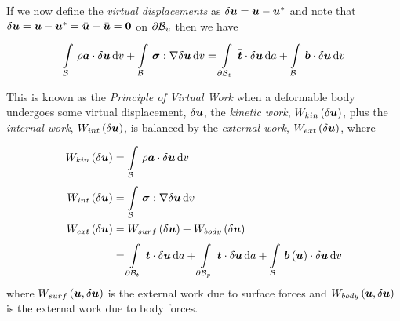 If we now define the \emph{virtual displacements} as
$\delta \boldsymbol{u} = \boldsymbol{u} - \boldsymbol{u} ^{*}$ and note that
$\delta \boldsymbol{u} = \boldsymbol{u} - \boldsymbol{u} ^{*}=\bar{ \boldsymbol{u} }-\bar{ \boldsymbol{u} }= \boldsymbol{0} $
on $ \partial{\ensuremath{ \mathcal{B} }} _{u}$ then we have
\begin{equation}
  \gint{\embedmanifold{B}}{}{\dotprod{\rho\vectr{a}}{\delta\vectr{u}}}{v}+
  \gint{\embedmanifold{B}}{}{\doubledotprod{\tensor{\sigma}}{\gradient{}{\delta\vectr{u}}}}{v}=
  \gint{\boundary{\embedmanifold{B}}_{t}}{}{\dotprod{\bar{\vectr{t}}}{\delta\vectr{u}}}{a}+
  \gint{\embedmanifold{B}}{}{\dotprod{\vectr{b}}{\delta\vectr{u}}}{v}
  \label{eqn:virtualworkstatment}
\end{equation}

This is known as the \emph{Principle of Virtual Work} \ie when a deformable
body undergoes some virtual displacement, $\delta \boldsymbol{u} $, the \emph{kinetic
  work}, $ W_{kin}\left( \delta \boldsymbol{u}  \right) $, plus the \emph{internal work},
$ W_{int}\left( \delta \boldsymbol{u}  \right) $, is balanced by the \emph{external work},
$ W_{ext}\left( \delta \boldsymbol{u}  \right) $, where
\begin{equation}
  \begin{split}
    \fnof{W_{kin}}{\delta\vectr{u}}&=
    \gint{\embedmanifold{B}}{}{\rho\dotprod{\vectr{a}}{\delta\vectr{u}}}{v}\\
    \fnof{W_{int}}{\delta\vectr{u}}&=
    \gint{\embedmanifold{B}}{}{\doubledotprod{\tensor{\sigma}}{\gradient{}{\delta\vectr{u}}}}{v}\\
    \fnof{W_{ext}}{\delta\vectr{u}}&=\fnof{W_{surf}}{\delta\vectr{u}}+\fnof{W_{body}}{\delta\vectr{u}}\\
    &=\gint{\boundary{\embedmanifold{B}}_{t}}{}{\dotprod{\bar{\vectr{t}}}{\delta\vectr{u}}}{a}+
    \gint{\boundary{\embedmanifold{B}}_{p}}{}{\dotprod{\bar{\vectr{t}}}{\delta\vectr{u}}}{a}+
    \gint{\embedmanifold{B}}{}{\dotprod{\fnof{\vectr{b}}{\vectr{u}}}{\delta\vectr{u}}}{v}
  \end{split}
\end{equation}
where $ W_{surf}\left(  \boldsymbol{u} ,\delta \boldsymbol{u}  \right) $ is the external work due to surface
forces and $ W_{body}\left(  \boldsymbol{u} ,\delta \boldsymbol{u}  \right) $ is the external work due to
body forces. 

